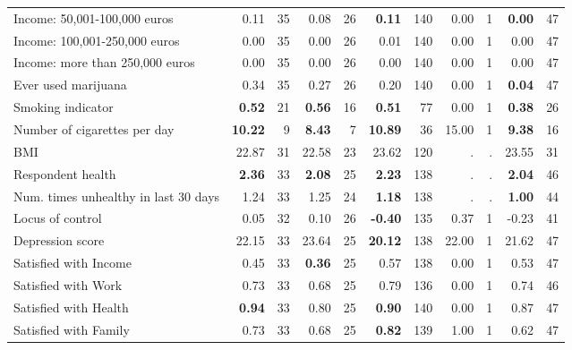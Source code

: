 \begin{tabular}{l r r r r r r r r r r}
Income: 50,001-100,000 euros &      0.11 &        35 &      0.08 &        26 & \textbf{     0.11} &       140 &      0.00 &         1 & \textbf{     0.00} &        47 \\
Income: 100,001-250,000 euros &      0.00 &        35 &      0.00 &        26 &      0.01 &       140 &      0.00 &         1 &      0.00 &        47 \\
Income: more than 250,000 euros &      0.00 &        35 &      0.00 &        26 &      0.00 &       140 &      0.00 &         1 &      0.00 &        47 \\
Ever used marijuana &      0.34 &        35 &      0.27 &        26 &      0.20 &       140 &      0.00 &         1 & \textbf{     0.04} &        47 \\
Smoking indicator & \textbf{     0.52} &        21 & \textbf{     0.56} &        16 & \textbf{     0.51} &        77 &      0.00 &         1 & \textbf{     0.38} &        26 \\
Number of cigarettes per day & \textbf{    10.22} &         9 & \textbf{     8.43} &         7 & \textbf{    10.89} &        36 &     15.00 &         1 & \textbf{     9.38} &        16 \\
BMI &     22.87 &        31 &     22.58 &        23 &     23.62 &       120 &         . & . &     23.55 &        31 \\
Respondent health & \textbf{     2.36} &        33 & \textbf{     2.08} &        25 & \textbf{     2.23} &       138 &         . & . & \textbf{     2.04} &        46 \\
Num. times unhealthy in last 30 days &      1.24 &        33 &      1.25 &        24 & \textbf{     1.18} &       138 &         . & . & \textbf{     1.00} &        44 \\
Locus of control &      0.05 &        32 &      0.10 &        26 & \textbf{    -0.40} &       135 &      0.37 &         1 &     -0.23 &        41 \\
Depression score &     22.15 &        33 &     23.64 &        25 & \textbf{    20.12} &       138 &     22.00 &         1 &     21.62 &        47 \\
Satisfied with Income &      0.45 &        33 & \textbf{     0.36} &        25 &      0.57 &       138 &      0.00 &         1 &      0.53 &        47 \\
Satisfied with Work &      0.73 &        33 &      0.68 &        25 &      0.79 &       136 &      0.00 &         1 &      0.74 &        46 \\
Satisfied with Health & \textbf{     0.94} &        33 &      0.80 &        25 & \textbf{     0.90} &       140 &      0.00 &         1 &      0.87 &        47 \\
Satisfied with Family &      0.73 &        33 &      0.68 &        25 & \textbf{     0.82} &       139 &      1.00 &         1 &      0.62 &        47 \\
\bottomrule
\end{tabular}
